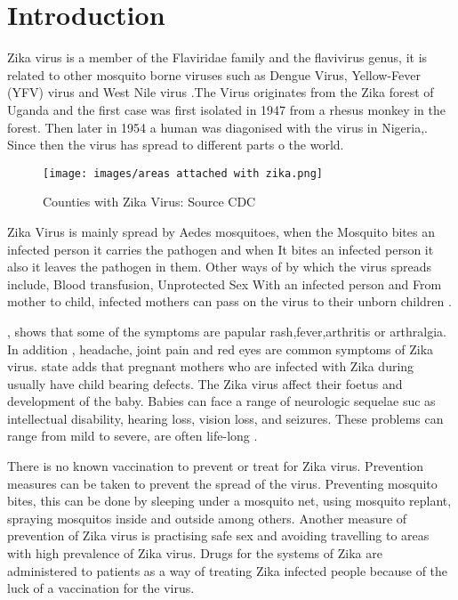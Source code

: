 \chapter{Introduction}

Zika virus is a member of the Flaviridae family
and the flavivirus genus, it is related to other mosquito borne viruses such as Dengue Virus, Yellow-Fever (YFV) virus  and West Nile virus \citep{doi}.The Virus originates from the Zika forest of Uganda and the first case was first isolated in 1947 from a rhesus monkey in the forest. Then later in 1954 a human was diagonised with the virus in Nigeria,\citep{2015zika}. Since then the virus has spread to different parts o the world. 
\begin{figure}[h!]
\centering
\texttt{[image: images/areas attached with zika.png]}
\caption{Counties with Zika Virus: Source CDC}\label{fig 1}
\end{figure}


Zika Virus is mainly spread by Aedes mosquitoes, when the Mosquito bites an infected person it carries the pathogen and when It bites an infected person it also it leaves the pathogen in them. Other ways of by which the virus spreads include, Blood transfusion, Unprotected Sex With an infected person and From mother to child, infected mothers can pass on the virus to their unborn children \citep{musso2014}.

\cite{musso2015}, shows that some of the symptoms are papular rash,fever,arthritis or arthralgia. In addition , headache, joint pain and red eyes are common symptoms of Zika virus. \cite{simoes2016zika} state adds that pregnant mothers who are infected with Zika during usually have child bearing defects. The Zika virus affect their foetus and development of the baby. Babies can face a range of neurologic sequelae suc as intellectual disability, hearing loss, vision loss, and seizures. These problems can range from mild to severe, are often life-long \citep{rasmussen2016zika}.

There is no known vaccination to prevent or treat for Zika virus. Prevention measures can be taken to prevent the spread of the virus. Preventing mosquito bites, this can be done by sleeping under a mosquito net, using mosquito replant, spraying mosquitos inside and outside among others. Another measure of prevention of Zika virus is practising safe sex and avoiding travelling to areas with high prevalence of Zika virus. Drugs for the systems of Zika are administered to patients as a way of treating Zika infected people because of the luck of a vaccination for the virus.


